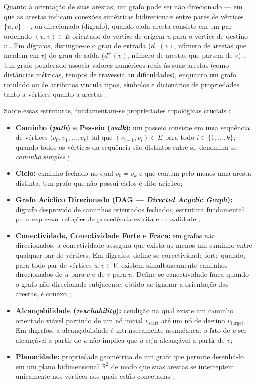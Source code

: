 Quanto à orientação de suas arestas, um grafo pode ser não direcionado --- em que as arestas indicam conexões simétricas bidirecionais entre pares de vértices $\{u, v\}$ ---, ou direcionado (dígrafo), quando cada aresta consiste em um par ordenado $(u, v) \in E$ orientado do vértice de origem $u$ para o vértice de destino $v$ \cite{cormen2009introduction, dormans2010}. Em dígrafos, distingue-se o grau de entrada ($d^-(v)$, número de arestas que incidem em $v$) do grau de saída ($d^+(v)$, número de arestas que partem de $v$) \cite{cormen2009introduction}. Um grafo ponderado associa valores numéricos reais às suas arestas (como distâncias métricas, tempos de travessia ou dificuldades), enquanto um grafo rotulado ou de atributos vincula tipos, símbolos e dicionários de propriedades tanto a vértices quanto a arestas \cite{dormans2010, linden2013designing, linden2014dungeons, chen2025narrative}.

Sobre essas estruturas, fundamentam-se propriedades topológicas cruciais \cite{cormen2009introduction}:
\begin{itemize}
    \item \textbf{Caminho (\textit{path}) e Passeio (\textit{walk}):} um passeio consiste em uma sequência de vértices $\langle v_0, v_1, \dots, v_k \rangle$ tal que $(v_{i-1}, v_i) \in E$ para todo $i \in \{1, \dots, k\}$; quando todos os vértices da sequência são distintos entre si, denomina-se \textit{caminho simples} \cite{cormen2009introduction};
    \item \textbf{Ciclo:} caminho fechado no qual $v_0 = v_k$ e que contém pelo menos uma aresta distinta. Um grafo que não possui ciclos é dito acíclico;
    \item \textbf{Grafo Acíclico Direcionado (DAG --- \textit{Directed Acyclic Graph}):} dígrafo desprovido de caminhos orientados fechados, estrutura fundamental para expressar relações de precedência estrita e causalidade \cite{cormen2009introduction};
    \item \textbf{Conectividade, Conectividade Forte e Fraca:} em grafos não direcionados, a conectividade assegura que exista ao menos um caminho entre qualquer par de vértices. Em dígrafos, define-se conectividade forte quando, para todo par de vértices $u, v \in V$, existem simultaneamente caminhos direcionados de $u$ para $v$ e de $v$ para $u$. Define-se conectividade fraca quando o grafo não direcionado subjacente, obtido ao ignorar a orientação das arestas, é conexo \cite{cormen2009introduction};
    \item \textbf{Alcançabilidade (\textit{reachability}):} condição na qual existe um caminho orientado viável partindo de um nó inicial $v_{\text{start}}$ até um nó de destino $v_{\text{target}}$ \cite{cormen2009introduction}. Em dígrafos, a alcançabilidade é intrinsecamente assimétrica: o fato de $v$ ser alcançável a partir de $u$ não implica que $u$ seja alcançável a partir de $v$;
    \item \textbf{Planaridade:} propriedade geométrica de um grafo que permite desenhá-lo em um plano bidimensional $\mathbb{R}^2$ de modo que suas arestas se interceptem unicamente nos vértices aos quais estão conectadas \cite{cormen2009introduction}.
\end{itemize}

